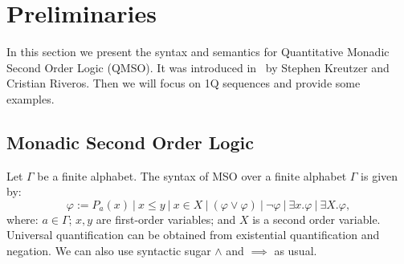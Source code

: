 \documentclass[12pt]{article}
\newcommand{\ifilip}[1]{\todo[inline,color=green!10]{{\bf Filip:} #1}}
\theoremstyle{definition}
\begin{document}





\section{Preliminaries}
In this section we present the syntax and semantics for Quantitative Monadic Second Order Logic (QMSO). It was introduced in~\cite{KreutzerR13} by Stephen Kreutzer and Cristian Riveros. Then we will focus on 1Q sequences and provide some examples.

\subsection{Monadic Second Order Logic}

Let $\Gamma$ be a finite alphabet. The syntax of MSO over a finite alphabet $\Gamma$ is given by:
$$ \varphi := P_a(x) \ | \ x \leq y \ | \ x \in X \ | \ (\varphi \lor \varphi) \ | \ \neg \varphi \ | \ \exists x. \varphi \ | \ \exists X . \varphi, $$
where: $a \in \Gamma$; $x, y$ are first-order variables; and $X$ is a second order variable. Universal quantification can be obtained from existential quantification and negation. We can also use syntactic sugar $\land$ and $\implies$ as usual.
\end{document}
